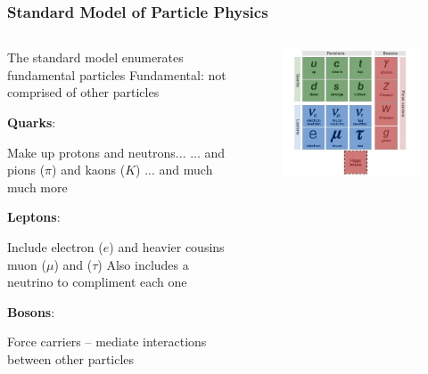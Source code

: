 \documentclass[10pt,professionalfonts,xcolor=table]{beamer}
\begin{document}
\frame
{
  \frametitle{Standard Model of Particle Physics}

\begin{columns}[c]
  \begin{itemize}
  \bang The standard model enumerates fundamental particles
  \bang Fundamental: not comprised of other particles

  \bang \textbf{Quarks}:
    \begin{itemize}
    \bing Make up protons and neutrons...
    \bong ... and pions ($\pi$) and kaons ($K$)
    \bong ... and much much more

    \end{itemize}
  \bang \textbf{Leptons}:
    \begin{itemize}
    \bing Include electron ($e$) and heavier cousins muon ($\mu$) and ($\tau$)
    \bing Also includes a neutrino to compliment each one
    \end{itemize}
  \bang \textbf{Bosons}:
    \begin{itemize}
    \bing Force carriers -- mediate interactions between other particles
    \end{itemize}

  \end{itemize}
    \begin{figure}
  \includegraphics[width=\textwidth]{figures/figures/stdmod.jpg}
  \end{figure}
\end{columns}

}
\end{document}
